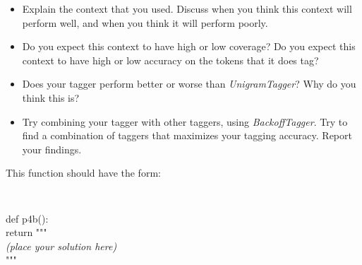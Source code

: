 \documentclass{cis530}
\begin{document}
\begin{itemize}
    \item Explain the context that you used.  Discuss when you think
    this context will perform well, and when you think it will perform
    poorly.  

    \item Do you expect this context to have high or low coverage?  Do
    you expect this context to have high or low accuracy on the tokens
    that it does tag?

    \item Does your tagger perform better or worse than
    \textit{UnigramTagger}?  Why do you think this is?

    \item Try combining your tagger with other taggers, using
    \textit{BackoffTagger}.  Try to find a combination of taggers that
    maximizes your tagging accuracy.  Report your findings.
\end{itemize}

This function should have the form:

{\tt
\begin{tabbing}
def p4b():\\
\qquad return """\\
\textit{(place your solution here)}\\
"""
\end{tabbing}
}
\end{document}
